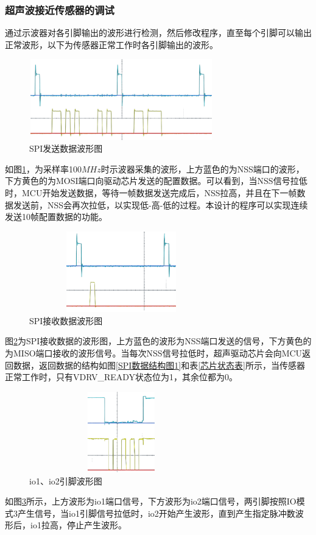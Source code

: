 \subsubsection{超声波接近传感器的调试}
通过示波器对各引脚输出的波形进行检测，然后修改程序，直至每个引脚可以输出正常波形，以下为传感器正常工作时各引脚输出的波形。\par
\begin{figure}[!h]
	\centering
	\includegraphics[width=8cm,height=3.5cm]{figure/debug waveform1.png}
	\caption{SPI发送数据波形图}
	\label{SPI发送数据波形图}
\end{figure}\par
如图\ref{SPI发送数据波形图}，为采样率100$MHz$时示波器采集的波形，上方蓝色的为NSS端口的波形，下方黄色的为MOSI端口向驱动芯片发送的配置数据。可以看到，当NSS信号拉低时，MCU开始发送数据，等待一帧数据发送完成后，NSS拉高，并且在下一帧数据发送前，NSS会再次拉低，以实现低-高-低的过程。本设计的程序可以实现连续发送10帧配置数据的功能。
\begin{figure}[!h]
	\centering
	\includegraphics[width=8cm,height=3.5cm]{figure/debug waveform2.png}
	\caption{SPI接收数据波形图}
	\label{SPI接收数据波形图}
\end{figure}\par
图\ref{SPI接收数据波形图}为SPI接收数据的波形图，上方蓝色的波形为NSS端口发送的信号，下方黄色的为MISO端口接收的波形信号。当每次NSS信号拉低时，超声驱动芯片会向MCU返回数据，返回数据的结构如图\ref{SPI数据结构图1}和表\ref{芯片状态表}所示，当传感器正常工作时，只有VDRV\_READY状态位为1，其余位都为0。
\newpage
\begin{figure}[!h]
	\centering
	\includegraphics[width=8cm,height=3.5cm]{figure/debug waveform9.png}
	\caption{io1、io2引脚波形图}
	\label{io1、io2引脚波形图}
\end{figure}\par
如图\ref{io1、io2引脚波形图}所示，上方波形为io1端口信号，下方波形为io2端口信号，两引脚按照IO模式3产生信号，当io1引脚信号拉低时，io2开始产生波形，直到产生指定脉冲数波形后，io1拉高，停止产生波形。

